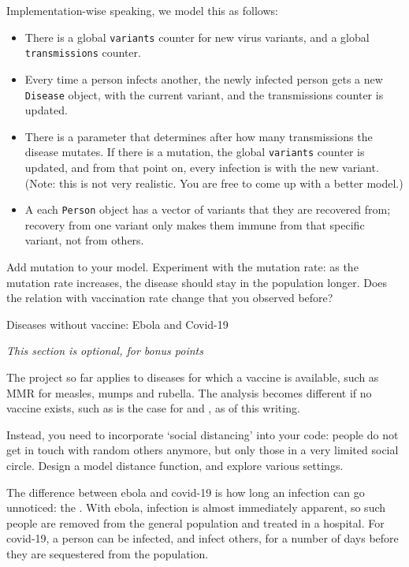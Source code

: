 Implementation-wise speaking, we model this as follows:
\begin{itemize}
\item There is a global \lstinline{variants} counter for new virus variants,
  and a global \lstinline{transmissions} counter.
\item Every time a person infects another, the newly infected person gets
  a new \lstinline{Disease} object, with the current variant,
  and the transmissions counter is updated.
\item There is a parameter that determines after how many transmissions the disease mutates.
  If there is a mutation, the global \lstinline{variants} counter is updated,
  and from that point on, every infection is with the new variant.
  (Note: this is not very realistic. You are free to come up with a better model.)
\item A each \lstinline{Person} object has a vector of variants that they are recovered from;
  recovery from one variant only makes them immune from that specific variant, not from others.
\end{itemize}

\begin{exercise}
  Add mutation to your model. Experiment with the mutation rate:
  as the mutation rate increases, the disease should stay in the population longer.
  Does the relation with vaccination rate change that you observed before?
\end{exercise}

 {Diseases without vaccine: Ebola and Covid-19}

\emph{This section is optional, for bonus points}

The project so far applies to diseases for which a vaccine is available,
such as MMR for measles, mumps and rubella.
The analysis becomes different if no vaccine exists, such
as is the case for  and ,
as of this writing.

Instead, you need to incorporate `social distancing' into your code:
people do not get in touch with random others anymore,
but only those in a very limited social circle.
Design a model distance function, and explore various settings.

The difference between ebola and covid-19 is how long an
infection can go unnoticed: the .
With ebola, infection is almost
immediately apparent, so such people are removed from the
general population and treated in a hospital.
For covid-19, a person can be infected, and infect others,
for a number of days before they are sequestered from the population.


